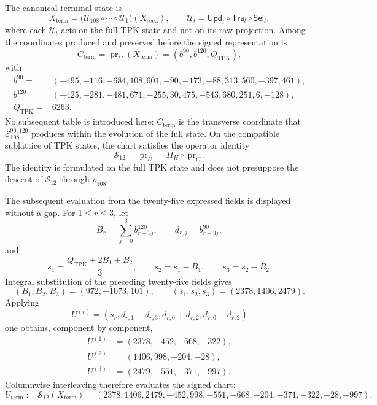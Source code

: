 The canonical terminal state is
\[
 X_{\mathrm{term}}
 =\bigl(\mathcal U_{108}\circ\cdots\circ\mathcal U_1\bigr)
   (X_{\mathrm{seed}}),
 \qquad
 \mathcal U_t=\mathsf{Upd}_t\circ\mathsf{Tra}_t\circ\mathsf{Sel}_t,
\]
where each \(\mathcal U_t\) acts on the full TPK state and not on its raw
projection. Among the coordinates produced and preserved before the signed
representation is
\[
 C_{\mathrm{term}}=\operatorname{pr}_{C}(X_{\mathrm{term}})
 =(b^{90},b^{120},Q_{\mathrm{TPK}}),
\]
with
\begin{align*}
 b^{90}={}&(-495,-116,-684,108,601,-90,
              -173,-88,313,560,-397,461),\\
 b^{120}={}&(-425,-281,-481,671,-255,30,
               475,-543,680,251,6,-128),\\
 Q_{\mathrm{TPK}}={}&6263.
\end{align*}
No subsequent table is introduced here: \(C_{\mathrm{term}}\) is the
transverse coordinate that \(\mathcal E_{108}^{90,120}\) produces within the
evolution of the full state. On the compatible sublattice of TPK states, the
chart satisfies the operator identity
\begin{equation}
 \mathcal S_{12}=\operatorname{pr}_{U}
 =\Pi_H\circ\operatorname{pr}_{C}.
 \label{eq:registro-identidad-s12-pih}
\end{equation}
The identity is formulated on the full TPK state and does not presuppose the
descent of \(\mathcal S_{12}\) through \(\rho_{108}\).

The subsequent evaluation from the twenty-five expressed fields is displayed
without a gap. For \(1\le r\le3\), let
\[
 B_r=\sum_{j=0}^{3}b^{120}_{r+3j},\qquad
 d_{r,j}=b^{90}_{r+3j},
\]
and
\[
 s_1=\frac{Q_{\mathrm{TPK}}+2B_1+B_2}{3},\qquad
 s_2=s_1-B_1,\qquad s_3=s_2-B_2.
\]
Integral substitution of the preceding twenty-five fields gives
\[
 (B_1,B_2,B_3)=(972,-1073,101),\qquad
 (s_1,s_2,s_3)=(2378,1406,2479).
\]
Applying
\[
 U^{(r)}=(s_r,d_{r,1}-d_{r,3},d_{r,0}+d_{r,2},d_{r,0}-d_{r,2})
\]
one obtains, component by component,
\begin{align*}
 U^{(1)}&=(2378,-452,-668,-322),\\
 U^{(2)}&=(1406,998,-204,-28),\\
 U^{(3)}&=(2479,-551,-371,-997).
\end{align*}
Columnwise interleaving therefore evaluates the signed chart:
\begin{equation}
 U_{\mathrm{term}}:=\mathcal S_{12}(X_{\mathrm{term}})
 =(2378,1406,2479,-452,998,-551,-668,-204,-371,-322,-28,-997).
 \label{eq:registro-uterm-desde-estado-pleno}
\end{equation}

